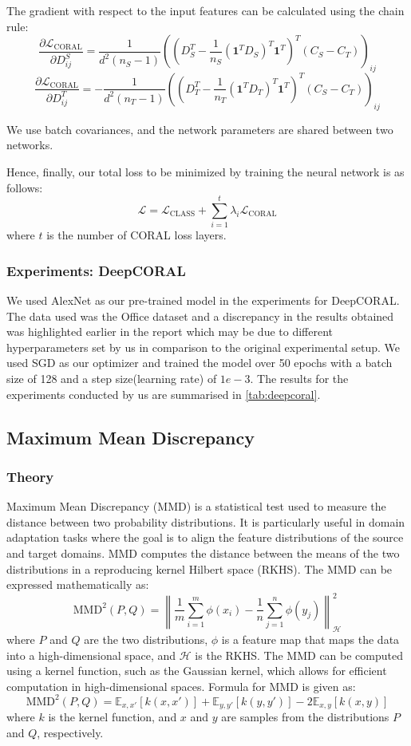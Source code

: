 \documentclass{article}
\begin{document}
The gradient with respect to the input features can be calculated using the chain rule:
\[
\frac{\partial \mathcal{L}_{\text{CORAL}}}{\partial D_{ij}^S} = \frac{1}{d^2 (n_S - 1)} \left( \left( D_S^T - \frac{1}{n_S} \left( \mathbf{1}^T D_S \right)^T \mathbf{1}^T \right)^T (C_S - C_T) \right)_{ij} \tag{4}
\]
\[
\frac{\partial \mathcal{L}_{\text{CORAL}}}{\partial D_{ij}^T} = - \frac{1}{d^2 (n_T - 1)} \left( \left( D_T^T - \frac{1}{n_T} \left( \mathbf{1}^T D_T \right)^T \mathbf{1}^T \right)^T (C_S - C_T) \right)_{ij} \tag{5}
\]

We use batch covariances, and the network parameters are shared between two networks.

Hence, finally, our total loss to be minimized by training the neural network is as follows:
$$\mathcal{L} = \mathcal{L}_\text{CLASS} + \sum_{i=1}^{t} \lambda_i \mathcal{L}_{\text{CORAL}}$$
where $t$ is the number of CORAL loss layers.

\subsubsection{Experiments: DeepCORAL}
We used AlexNet as our pre-trained model in the experiments for DeepCORAL. The data used was the Office dataset and a discrepancy in the results obtained was highlighted earlier in the report which may be due to different hyperparameters set by us in comparison to the original experimental setup. We used SGD as our optimizer and trained the model over 50 epochs with a batch size of 128 and a step size(learning rate) of $1e-3$. The results for the experiments conducted by us are summarised in \ref{tab:deepcoral}.

\subsection{Maximum Mean Discrepancy}
\subsubsection{Theory}
Maximum Mean Discrepancy (MMD) is a statistical test used to measure the distance between two probability distributions. It is particularly useful in domain adaptation tasks where the goal is to align the feature distributions of the source and target domains. MMD computes the distance between the means of the two distributions in a reproducing kernel Hilbert space (RKHS). The MMD can be expressed mathematically as:
\[
  \text{MMD}^2(P, Q) = \left\| \frac{1}{m} \sum_{i=1}^{m} \phi(x_i) - \frac{1}{n} \sum_{j=1}^{n} \phi(y_j) \right\|^2_{\mathcal{H}}
\]
where \(P\) and \(Q\) are the two distributions, \(\phi\) is a feature map that maps the data into a high-dimensional space, and \(\mathcal{H}\) is the RKHS. The MMD can be computed using a kernel function, such as the Gaussian kernel, which allows for efficient computation in high-dimensional spaces. 
Formula for MMD is given as:
\[
  \text{MMD}^2(P, Q) = \mathbb{E}_{x,x'}[k(x,x')] + \mathbb{E}_{y,y'}[k(y,y')] - 2\mathbb{E}_{x,y}[k(x,y)]
\]
where \(k\) is the kernel function, and \(x\) and \(y\) are samples from the distributions \(P\) and \(Q\), respectively. 
\end{document}
